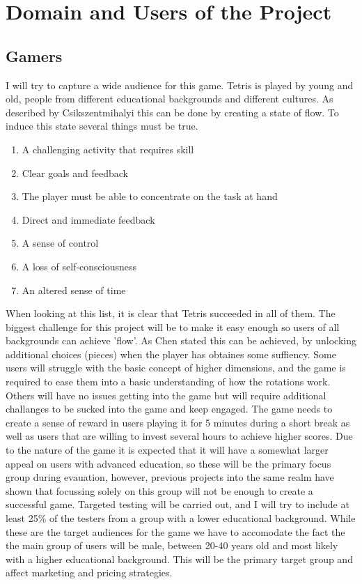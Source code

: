 \documentclass{article}
\begin{document}
\section{Domain and Users of the Project}
\subsection{Gamers}
I will try to capture a wide audience for this game. 
Tetris is played by young and old, people from different educational backgrounds and different cultures.
As described by Csikszentmihalyi \cite{flow} this can be done by creating a state of flow. To induce this state several things must be true.
\begin{enumerate}
    \item A challenging activity that requires skill
    \item Clear goals and feedback
    \item The player must be able to concentrate on the task at hand
    \item Direct and immediate feedback
    \item A sense of control
    \item A loss of self-consciousness
    \item An altered sense of time
\end{enumerate}
When looking at this list, it is clear that Tetris succeeded in all of them. The biggest challenge for this project will be to make it easy enough so users of all backgrounds can achieve 'flow'. As Chen \cite{flow_2} stated this can be achieved, by unlocking additional choices (pieces) when the player has obtaines some suffiency. Some users will struggle with the basic concept of higher dimensions, and the game is required to ease them into a basic understanding of how the rotations work. Others will have no issues getting into the game but will require additional challanges to be sucked into the game and keep engaged. The game needs to create a sense of reward in users playing it for 5 minutes during a short break as well as users that are willing to invest several hours to achieve higher scores. Due to the nature of the game it is expected that it will have a somewhat larger appeal on users with advanced education, so these will be the primary focus group during evauation, however, previous projects into the same realm have shown that focussing solely on this group will not be enough to create a successful game. Targeted testing will be carried out, and I will try to include at least 25\% of the testers from a group with a lower educational background.
\newline
While these are the target audiences for the game we have to accomodate the fact the the main group of users will be male, between 20-40 years old and most likely with a higher educational background. This will be the primary target group and affect marketing and pricing strategies.
\end{document}
